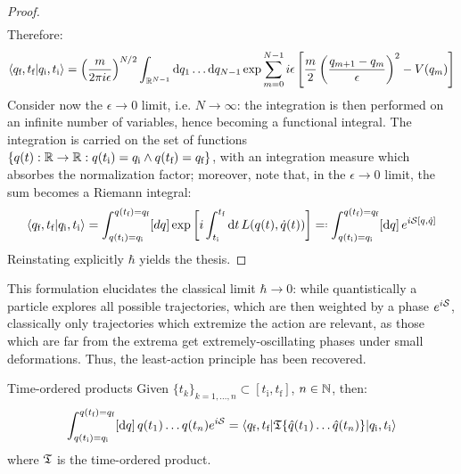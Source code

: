 \begin{proofbox}
\begin{proof}
\begin{equation*}
\begin{split}
      \end{split}
    \end{equation*}
    Therefore:
    \begin{equation*}
      \braket{q_\text{f},t_\text{f} | q_\text{i},t_\text{i}} = \left( \frac{m}{2\pi i \epsilon} \right)^{N/2} \int_{\mathbb{R}^{N-1}} \mathrm{d} q_1 \dots \mathrm{d} q_{N-1} \exp \sum_{m = 0}^{N - 1} i \epsilon \left[ \frac{m}{2} \left( \frac{q_{m+1} - q_m}{\epsilon} \right)^2 - V(q_m) \right]
    \end{equation*}
    Consider now the $ \epsilon \rightarrow 0 $ limit, i.e. $ N \rightarrow \infty $: the integration is then performed on an infinite number of variables, hence becoming a functional integral. The integration is carried on the set of functions $ \{q(t) : \mathbb{R} \rightarrow \mathbb{R} : q(t_\text{i}) = q_\text{i} \land q(t_\text{f}) = q_\text{f}\} $, with an integration measure which absorbes the normalization factor; moreover, note that, in the $ \epsilon \rightarrow 0 $ limit, the sum becomes a Riemann integral:
    \begin{equation*}
      \braket{q_\text{f},t_\text{f} | q_\text{i},t_\text{i}} = \int_{q(t_\text{i}) = q_\text{i}}^{q(t_\text{f}) = q_\text{f}} [dq] \exp \left[ i \int_{t_\text{i}}^{t_\text{f}} \dd t\, L(q(t),\dot q(t)) \right] \eqdef \int_{q(t_\text{i}) = q_\text{i}}^{q(t_\text{f}) = q_\text{f}} [\dd q]\, e^{i \act[q,\dot q]}
    \end{equation*}
    Reinstating explicitly $ \hbar $ yields the thesis.
  \end{proof}
\end{proofbox}

This formulation elucidates the classical limit $ \hbar \rightarrow 0 $: while quantistically a particle explores all possible trajectories, which are then weighted by a phase $ e^{i\mathcal{S}} $, classically only trajectories which extremize the action are relevant, as those which are far from the extrema get extremely-oscillating phases under small deformations. Thus, the least-action principle has been recovered.

\newpage

\begin{lemma}{Time-ordered products}{}
  Given $ \{t_k\}_{k = 1, \dots, n} \subset [t_\text{i} , t_\text{f}] $, $ n \in \mathbb{N} $, then:
  \begin{equation*}
    \int_{q(t_\text{i}) = q_\text{i}}^{q(t_\text{f}) = q_\text{f}} [\mathrm{d} q]\, q(t_1) \dots q(t_n) e^{i \mathcal{S}} = \braket{q_\text{f},t_\text{f} | \mathfrak{T}\{\hat{q}(t_1) \dots \hat{q}(t_n)\} | q_\text{i},t_\text{i}}
  \end{equation*}
  where $ \mathfrak{T} $ is the time-ordered product.
\end{lemma}

